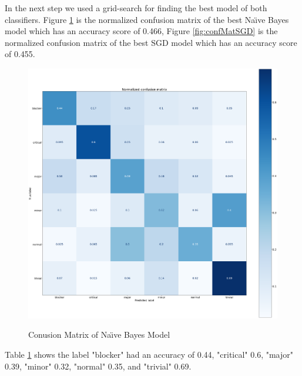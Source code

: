 \documentclass[sigconf,screen]{acmart}
\begin{document}
In the next step we used a grid-search for finding the best model of both classifiers. Figure \ref{fig:confMatNB} is the normalized confusion matrix of the best Na{\"\i}ve Bayes model which has an accuracy score of 0.466,  Figure \ref{fig:confMatSGD} is the normalized confusion matrix of the best SGD model which has an accuracy score of 0.455.

\begin{figure}[h]
	\caption{Conusion Matrix of Na{\"\i}ve Bayes Model}
	\centering
	\includegraphics[scale=0.1]{norm_conf_matrix_nb}
	\label{fig:confMatNB}	
\end{figure}

Table \ref{fig:confMatNB} shows the label "blocker" had an accuracy of 0.44, "critical"  0.6, "major" 0.39, "minor" 0.32, "normal" 0.35, and "trivial" 0.69.
\end{document}
